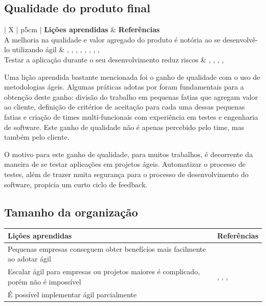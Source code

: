 \subsection{Qualidade do produto final}

\begin{table}[H]
	\centering
	\begin{tabularx}{\linewidth}{ | X | p{5cm} | } \hline \textbf{Lições aprendidas} & \textbf{Referências} \\ \hline
		A melhoria na qualidade e valor agregado do produto é notória ao se desenvolvê-lo utilizando ágil & \cite{Adobe2012}, \cite{Fitzgerald2013}, \cite{Bustard2013}, \cite{Lapham2012}, \cite{Eunha2012}, \cite{Claudia2013}, \cite{Parzinello2012}, \cite{Maciel2013}, \cite{Ahmed2008} \\ \hline
		Testar a aplicação durante o seu desenvolvimento reduz riscos & \cite{Korhonen2010}, \cite{Lapham2012}, \cite{Eunha2012}, \cite{Parzinello2012}, \cite{Ahmed2008} \\ \hline
	\end{tabularx}
\end{table}

Uma lição aprendida bastante mencionada foi o ganho de qualidade com o uso de metodologias ágeis. Algumas práticas adotas por \cite{Adobe2012} foram fundamentais para a obtenção deste ganho: divisão do trabalho em pequenas fatias que agregam valor ao cliente, definição de critérios de aceitação para cada uma dessas pequenas fatias e criação de times multi-funcionais com experiência em testes e engenharia de software. Este ganho de qualidade não é apenas percebido pelo time, mas também pelo cliente.

O motivo para este ganho de qualidade, para muitos trabalhos, é decorrente da maneira de se testar aplicações em projetos ágeis. Automatizar o processo de testes, além de trazer muita segurança para o processo de desenvolvimento do software, propicia um curto ciclo de feedback.

\subsection{Tamanho da organização}

\begin{table}[H]
	\centering
	\begin{tabularx}{\linewidth}{ | X | p{5cm} | } \hline \textbf{Lições aprendidas} & \textbf{Referências} \\ \hline
		Pequenas empresas conseguem obter benefícios mais facilmente ao adotar ágil & \cite{Bustard2013} \\ \hline
		Escalar ágil para empresas ou projetos maiores é complicado, porém não é impossível & \cite{Microsoft2013}, \cite{Claudia2013}, \cite{Korhonen2010}, \cite{Maciel2013} \\ \hline
		É possível implementar ágil parcialmente & \cite{Ericsson2013} \\ \hline
	\end{tabularx}
\end{table}

